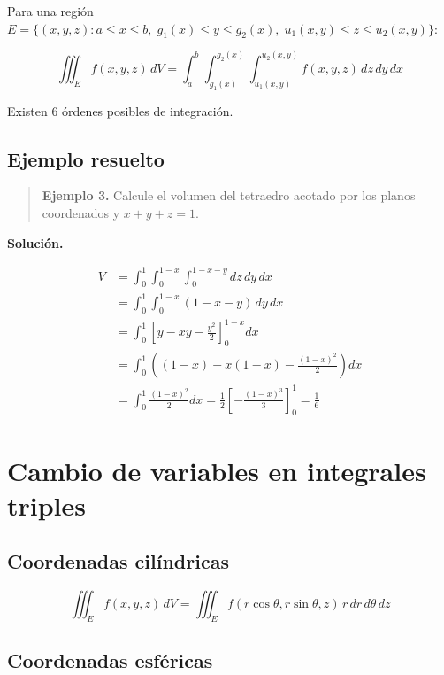 \documentclass[
]{book}
\begin{document}
Para una región \(E = \{(x, y, z) : a \leq x \leq b, \; g_1(x) \leq y \leq g_2(x), \; u_1(x, y) \leq z \leq u_2(x, y)\}\):

\[
\iiint_E f(x, y, z) \, dV = \int_a^b \int_{g_1(x)}^{g_2(x)} \int_{u_1(x,y)}^{u_2(x,y)} f(x, y, z) \, dz \, dy \, dx
\]

Existen 6 órdenes posibles de integración.

\subsection{Ejemplo resuelto}\label{ejemplo-resuelto-24}

\begin{quote}
\textbf{Ejemplo 3.} Calcule el volumen del tetraedro acotado por los planos coordenados y \(x + y + z = 1\).
\end{quote}

\textbf{Solución.}

\[
\begin{aligned}
V &= \int_0^1 \int_0^{1-x} \int_0^{1-x-y} dz \, dy \, dx \\
&= \int_0^1 \int_0^{1-x} (1 - x - y) \, dy \, dx \\
&= \int_0^1 \left[ y - xy - \frac{y^2}{2} \right]_0^{1-x} dx \\
&= \int_0^1 \left( (1-x) - x(1-x) - \frac{(1-x)^2}{2} \right) dx \\
&= \int_0^1 \frac{(1-x)^2}{2} dx = \frac{1}{2} \left[ -\frac{(1-x)^3}{3} \right]_0^1 = \frac{1}{6}
\end{aligned}
\]

\section{Cambio de variables en integrales triples}\label{cambio-de-variables-en-integrales-triples}

\subsection{Coordenadas cilíndricas}\label{coordenadas-ciluxedndricas-1}

\[
\iiint_E f(x, y, z) \, dV = \iiint_E f(r\cos\theta, r\sin\theta, z) \, r \, dr \, d\theta \, dz
\]

\subsection{Coordenadas esféricas}\label{coordenadas-esfuxe9ricas-1}
\end{document}
